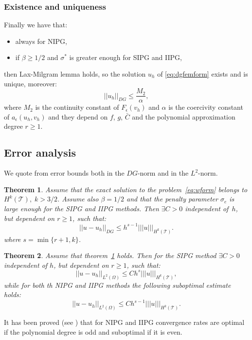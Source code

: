 \documentclass[12pt, a4paper]{article}
\theoremstyle{definition}
\theoremstyle{plain}
\theoremstyle{plain}
\newtheorem{teor}{Theorem}
\theoremstyle{definition}
\begin{document}
\subsubsection{Existence and uniqueness}
Finally we have that:
\begin{itemize}
	\item always for NIPG,
	\item if $\beta \geq 1/2$ and $\sigma^*$ is greater enough for SIPG and 
	IIPG,
\end{itemize}
then Lax-Milgram lemma holds, so the solution $u_h$ of \eqref{eq:dgfemform} 
exists and is unique, moreover:\\
\begin{equation*}
	|\!|u_h|\!|_{DG} \leq \frac{M_2}{\alpha},
\end{equation*}
where $M_2$ is the continuity constant of $F_\epsilon(v_h)$ and $\alpha$ is the 
coercivity constant of $a_\epsilon(u_h,v_h)$ and they depend on $f$, $g$, 
$\bar{C}$ and the polynomial approximation degree $r \geq 1$.
\subsection{Error analysis}
We quote from \cite{riviere} error bounds both in the $DG$-norm and in the $L^2$-norm.
\begin{teor} \label{teo:errdg}
	Assume that the exact solution to the problem~\eqref{eq:wform} belongs to 
	$H^k(\mathcal{T}), \; k>3/2$. Assume also $\beta = 1/2$ and that the 
	penalty parameter $\sigma_e$ is large enough for the SIPG and IIPG methods. 
	Then $\exists C>0$ independent of~$h$, but dependent on $r \geq 1$, such 
	that:
	\begin{equation*}
		|\!| u -u_h |\!|_{DG} \leq h^{s-1} |\!|\!|u|\!|\!|_{H^k(\mathcal{T})}.
	\end{equation*}
	where $s = \min \{r+1, k\}$.
\end{teor}
\begin{teor}
	Assume that theorem~\ref{teo:errdg} holds. Then for the SIPG method 
	$\exists C>0$ independent of $h$, but dependent on $r \geq 1$, such that:
	\begin{equation*}
		|\!| u-u_h |\!|_{L^2(\Omega)} \leq C h^{s} |\!|\!|u|\!|\!|_{H^k(\mathcal{T})},
	\end{equation*}
	while for both th NIPG and IIPG methods the following suboptimal estimate holds:
	\begin{equation*}
				|\!| u-u_h |\!|_{L^2(\Omega)} \leq C h^{s-1} 
				|\!|\!|u|\!|\!|_{H^k(\mathcal{T})}.
	\end{equation*}
\end{teor}
It has been proved (see \cite{ayuso}) that for NIPG and IIPG convergence rates 
are 
optimal if the 
polynomial degree is odd and suboptimal if it is even.
\end{document}
